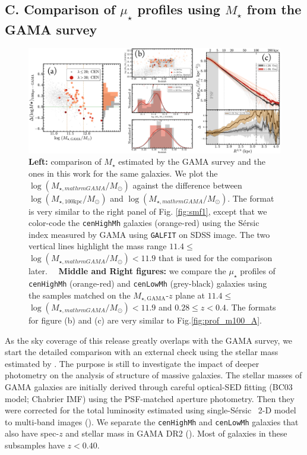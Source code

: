 \documentclass{emulateapj}
\def\galfit{{\tt GALFIT}}
\def\ser{{S\'{e}rsic\ }}
\def\rbcg{\texttt{cenHighMh}}
\def\nbcg{\texttt{cenLowMh}}
\def\mstar{{$M_{\star}$}}
\def\mgama{{$M_{\star,\mathrm{GAMA}}$}}
\def\logmtot{{$\log (M_{\star,100\mathrm{kpc}}/M_{\odot})$}}
\def\logmgama{{$\log (M_{\star,mathrm{GAMA}}/M_{\odot})$}}
\def\mden{{$\mu_{\star}$}}
\begin{document}
\begin{CJK*}{UTF8}{gbsn}

\section{C. Comparison of \mden{} profiles using \mstar{} from the GAMA survey}
    \label{app:C}

\begin{figure}[hbt!]
    \centering 
    \includegraphics[width=\textwidth]{fig/redbcg_prof_gama_new}
    \caption{\textbf{Left:} comparison of \mstar{} estimated by the GAMA survey and 
    the ones in this work for the same galaxies. 
    We plot the \logmgama{} against the difference between \logmtot{} and \logmgama{}. 
    The format is very similar to the right panel of Fig. \ref{fig:smf1}, except that
    we color-code the \rbcg{} galaxies (orange-red) using the \ser{} index measured by 
    GAMA using \galfit{} on SDSS image. 
    The two vertical lines highlight the mass range $11.4 \leq$\logmgama{}$<11.9$ that
    is used for the comparison later.~~
    \textbf{Middle and Right figures:} we compare the \mden{} profiles of \rbcg{} 
    (orange-red) and \nbcg{} (grey-black) galaxies using the samples matched on the 
    \mgama{}-$z$ plane at $11.4 \leq$\logmgama{}$<11.9$ and $0.28 \leq z < 0.4$. 
    The formats for figure (b) and (c) are very similar to Fig.\ref{fig:prof_m100_A}.}
    \label{figure:C1}
\end{figure}

    As the sky coverage of this release greatly overlaps with the GAMA survey,
    we start the detailed comparison with an external check using the stellar
    mass estimated by \citep{Taylor2011}. 
    The purpose is still to investigate the impact of deeper photometry on 
    the analysis of structure of massive galaxies.  
    The stellar masses of GAMA galaxies are initially derived through careful 
    optical-SED fitting (BC03 model; Chabrier IMF) using the PSF-matched 
    aperture photometry.  
    Then they were corrected for the total luminosity estimated using single-\ser{}
    2-D model to multi-band images (\citealt{Kelvin2012}).  
    We separate the \rbcg{} and \nbcg{} galaxies that also have 
    spec-$z$ and stellar mass in GAMA DR2 (\citealt{Liske2015}).
    Most of galaxies in these subsamples have $z < 0.40$. 
    

\end{CJK*}
\end{document}
